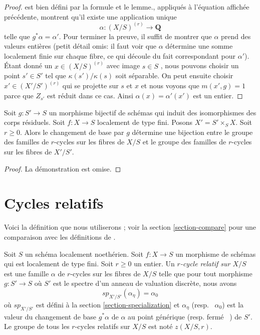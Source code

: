 \begin{proof}
{est bien défini par la formule et le lemme.}, 
appliqués à l'équation affichée précédente, 
montrent qu'il existe une application unique 
$$
\alpha : (X/S)^{(r)} \to \mathbf{Q}
$$
 telle que $g^*\alpha = \alpha'$. Pour terminer la preuve, il suffit 
de montrer que $\alpha$  prend des valeurs entières (petit détail omis:
 il faut voir que $\alpha$  détermine une somme localement finie
 sur chaque fibre, ce qui découle du fait correspondant pour  $\alpha'$). 
Étant donné un  $x \in (X/S)^{(r)}$  avec image $s \in S$
 , nous pouvons choisir un point  $s' \in S'$  tel que  $\kappa(s')/\kappa(s)$
  soit séparable. On peut ensuite choisir  $x' \in (X'/S')^{(r)}$  qui se projette
 sur $s$  et  $x$  et nous voyons que  $m(x', g) = 1$  parce que 
$Z_{s'}$  est réduit dans ce cas. Ainsi $\alpha(x) = \alpha'(x')$
 est un entier. 
\end{proof} 

\begin{lemma} 
\label{lemma-pullback-universally-bijective} 
Soit  $g : S' \to S$  un morphisme bijectif de schémas qui
 induit des isomorphismes des corps résiduels. 
Soit  $f : X \to S$  localement de type fini. Posons $X' = S' \times_S X$. 
Soit  $r \geq 0$. Alors le changement de base par  $g$ détermine une bijection
 entre le groupe des familles de  $r$-cycles sur les fibres de  $X/S$  et
 le groupe des familles de  $r$-cycles sur les fibres de  $X'/S'$. 
\end{lemma} 

\begin{proof} La 
démonstration est omise. 
\end{proof} 








\section{Cycles relatifs} 
\label{section-families-specialization} 

\noindent
 Voici la définition que nous utiliserons ; voir la section  \ref{section-compare}  
pour une comparaison avec les définitions de  \cite{SV}. 

\begin{definition} 
\label{definition-relative-cycles} 
Soit  $S$  un schéma localement noethérien. Soit  $f : X \to S$  un morphisme de 
schémas qui est localement de type fini. Soit  $r \geq 0$  un entier. 
Un {\it $r$-cycle relatif sur $X/S$} est une famille  $\alpha$  de  $r$-cycles 
sur les fibres de  $X/S$ telle que pour tout morphisme  $g : S' \to S$
  où  $S'$  est le spectre d'un anneau de valuation discrète, nous avons 
$$
sp_{X'/S'}(\alpha_\eta) = \alpha_0
$$
 où  $sp_{X'/S'}$  est défini à la section  \ref{section-specialization}  
et  $\alpha_\eta$  (resp. \ $\alpha_0$) est la valeur du changement de base  
$g^*\alpha$  de $\alpha$  au point générique (resp. fermé \ ) de  $S'$.
 Le groupe de tous les  $r$-cycles relatifs sur  $X/S$  est noté $z(X/S, r)$. 
\end{definition} 

